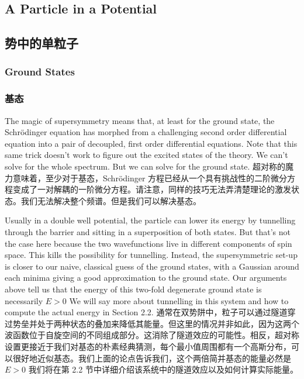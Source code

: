 \documentclass{ctexart}
\begin{document}
\begin{paracol}{2}
\subsection{A Particle in a Potential}
\switchcolumn
\subsection*{势中的单粒子}
\switchcolumn*

\subsubsection{Ground States}
\switchcolumn
\subsubsection*{基态}
\switchcolumn*

The magic of supersymmetry means that, at least for the ground state, the Schrödinger equation has morphed from a challenging second order differential equation into a pair of decoupled, first order differential equations. Note that this same trick doesn't work to figure out the excited states of the theory. We can't solve for the whole spectrum. But we can solve for the ground state.
\switchcolumn
超对称的魔力意味着，至少对于基态，Schrödinger 方程已经从一个具有挑战性的二阶微分方程变成了一对解耦的一阶微分方程。请注意，同样的技巧无法弄清楚理论的激发状态。我们无法解决整个频谱。但是我们可以解决基态。
\switchcolumn*

Usually in a double well potential, the particle can lower its energy by tunnelling through the barrier and sitting in a superposition of both states. But that's not the case here because the two wavefunctions live in different components of spin space. This kills the possibility for tunnelling. Instead, the supersymmetric set-up is closer to our naive, classical guess of the ground states, with a Gaussian around each minima giving a good approximation to the ground state. Our arguments above tell us that the energy of this two-fold degenerate ground state is necessarily $E > 0$ We will say more about tunnelling in this system and how to compute the actual energy in Section 2.2.
\switchcolumn
通常在双势阱中，粒子可以通过隧道穿过势垒并处于两种状态的叠加来降低其能量。但这里的情况并非如此，因为这两个波函数位于自旋空间的不同组成部分。这消除了隧道效应的可能性。相反，超对称设置更接近于我们对基态的朴素经典猜测，每个最小值周围都有一个高斯分布，可以很好地近似基态。我们上面的论点告诉我们，这个两倍简并基态的能量必然是 $E > 0$ 我们将在第 2.2 节中详细介绍该系统中的隧道效应以及如何计算实际能量。
\switchcolumn*


\end{paracol}
\end{document}
